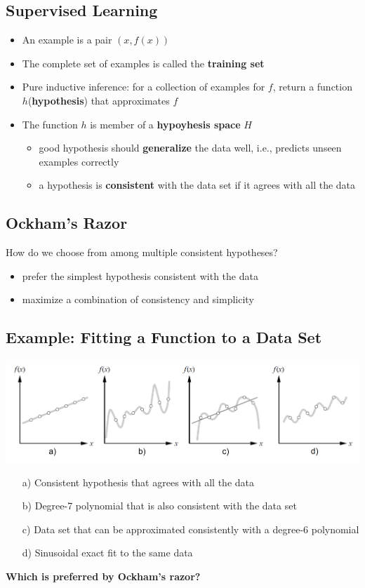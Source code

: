 \documentclass[conference, a4paper]{styles/acmsiggraph}
\begin{document}
    \subsection{Supervised Learning}
        \begin{itemize}
            \item An example is a pair $(x,f(x))$
            \item The complete set of examples is called the \textbf{training set}
            \item Pure inductive inference: for a collection of examples for $f$, return a function $h$(\textbf{hypothesis}) that approximates $f$
            \item The function $h$ is member of a \textbf{hypoyhesis space} $H$
            \begin{itemize}
                \item good hypothesis should \textbf{generalize} the data well, i.e., predicts unseen examples correctly
                \item a hypothesis is \textbf{consistent} with the data set if it agrees with all the data
            \end{itemize}
        \end{itemize}
    
    \subsection{Ockham's Razor}
        How do we choose from among multiple consistent hypotheses?
        \begin{itemize}
            \item prefer the simplest hypothesis consistent with the data
            \item maximize a combination of consistency and simplicity
        \end{itemize}

    \subsection{Example: Fitting a Function to a Data Set}
        \includegraphics[width=1\textwidth]{imgs/Polynomials.png}
        \begin{itemize}
            \item[a)] Consistent hypothesis that agrees with all the data
            \item[b)] Degree-7 polynomial that is also consistent with the data set
            \item[c)] Data set that can be approximated consistently with a degree-6 polynomial
            \item[d)] Sinusoidal exact fit to the same data
        \end{itemize}
        \textbf{Which is preferred by Ockham's razor?}
\end{document}
